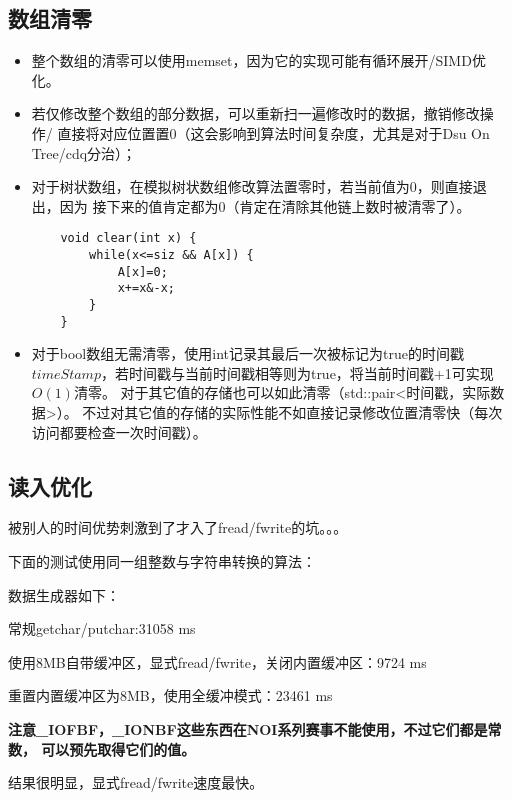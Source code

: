 \subsection{数组清零}
\begin{itemize}
    \item 整个数组的清零可以使用memset，因为它的实现可能有循环展开/SIMD优化。
    \item 若仅修改整个数组的部分数据，可以重新扫一遍修改时的数据，撤销修改操作/
    直接将对应位置置0（这会影响到算法时间复杂度，尤其是对于Dsu On Tree/cdq分治）；
    \item 对于树状数组，在模拟树状数组修改算法置零时，若当前值为0，则直接退出，因为
    接下来的值肯定都为0（肯定在清除其他链上数时被清零了）。
    \begin{lstlisting}
    void clear(int x) {
        while(x<=siz && A[x]) {
            A[x]=0;
            x+=x&-x;
        }
    }
    \end{lstlisting}
    \item 对于bool数组无需清零，使用int记录其最后一次被标记为true的时间戳
    $timeStamp$，若时间戳与当前时间戳相等则为true，将当前时间戳+1可实现$O(1)$清零。
    对于其它值的存储也可以如此清零（std::pair<时间戳，实际数据>）。
    不过对其它值的存储的实际性能不如直接记录修改位置清零快（每次访问都要检查一次时间戳）。
\end{itemize}
\subsection{读入优化}
被别人的时间优势刺激到了才入了fread/fwrite的坑。。。

下面的测试使用同一组整数与字符串转换的算法：


数据生成器如下：


常规getchar/putchar:31058 ms


使用8MB自带缓冲区，显式fread/fwrite，关闭内置缓冲区：9724 ms


重置内置缓冲区为8MB，使用全缓冲模式：23461 ms


{\bfseries 注意\_IOFBF，\_IONBF这些东西在NOI系列赛事不能使用，不过它们都是常数，
可以预先取得它们的值。}

结果很明显，显式fread/fwrite速度最快。
